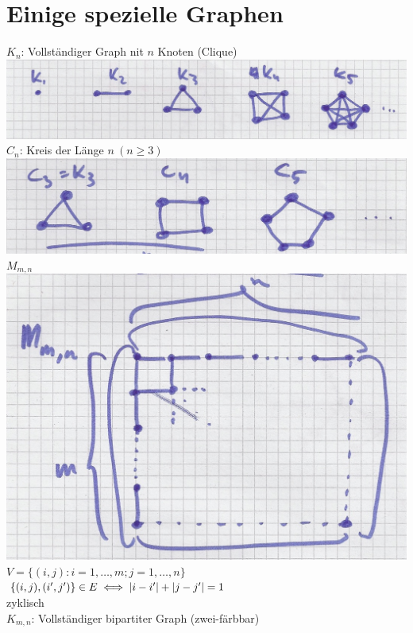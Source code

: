 \section{Einige spezielle Graphen}
$K_n$: Vollständiger Graph nit $n$ Knoten (Clique)\\
\includegraphics[width=\textwidth]{Bild44} \\
$C_n$: Kreis der Länge $n \:(n\geq 3)$\\
\includegraphics[width=\textwidth]{Bild45} \\
$M_{m,n}$\\
\includegraphics[width=\textwidth]{Bild46} \\
$V = \{ (i,j) : i = 1, \dotsc , m ; j = 1, \dotsc , n \}$\\
$\{(i,j),(i',j')\} \in E \iff \abs{i-i'} + \abs{j-j'} = 1$\\
zyklisch\\
$K_{m,n}$: Vollständiger bipartiter Graph (zwei-färbbar)\\
